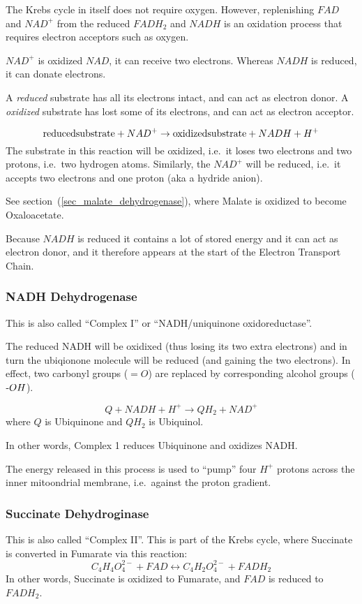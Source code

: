 \documentclass{article}
\def\mhyphen{{\hbox{-}}}
\begin{document}
The Krebs cycle in itself does not require oxygen. However, replenishing $FAD$ and $NAD^+$
from the reduced $FADH_2$ and $NADH$ is an oxidation process that requires electron
acceptors such as oxygen.

$NAD^+$ is oxidized $NAD$, it can receive two electrons.
Whereas $NADH$ is reduced, it can donate electrons.

A {\em reduced\/} substrate has all its electrons intact, and can act as electron donor.
A {\em oxidized\/} substrate has lost some of its electrons, and can act as electron
acceptor.

\[
    {\rm reduced substrate} + NAD^+ \rightarrow {\rm oxidized substrate} + NADH + H^+
\]
The substrate in this reaction will be oxidized, i.e.\ it loses two electrons and two
protons, i.e.\ two hydrogen atoms. Similarly, the $NAD^+$ will be reduced, i.e.\ it
accepts two electrons and one proton (aka a hydride anion).

See section~(\ref{sec_malate_dehydrogenase}), where Malate is oxidized to become
Oxaloacetate.

Because $NADH$ is reduced it contains a lot of stored energy and it can act as electron
donor, and it therefore appears at the start of the Electron Transport Chain.

\subsubsection{NADH Dehydrogenase}
This is also called ``Complex I'' or ``NADH/uniquinone oxidoreductase''.

The reduced NADH will be oxidixed (thus losing its two extra electrons) and in turn
the ubiqionone molecule will be reduced (and gaining the two electrons).
In effect, two carbonyl groups ($=O$) are replaced by corresponding alcohol groups
(${\mhyphen}OH$).

\[
    Q + NADH + H^+ \rightarrow QH_2 + NAD^+
\]
where $Q$ is Ubiquinone and $QH_2$ is Ubiquinol.

In other words, Complex 1 reduces Ubiquinone and oxidizes NADH\@.

The energy released in this process is used to ``pump'' four $H^+$ protons across the
inner mitoondrial membrane, i.e.\ against the proton gradient.

\subsubsection{Succinate Dehydroginase}
This is also called ``Complex II''. This is part of the Krebs cycle, where
Succinate is converted in Fumarate via this reaction:
\[
    C_4H_4O_4^{2-} + FAD \leftrightarrow C_4H_2O_4^{2-} + FADH_2
\]
In other words, Succinate is oxidized to Fumarate, and $FAD$ is reduced to $FADH_2$.
\end{document}
